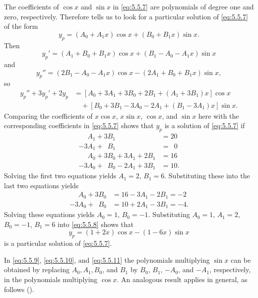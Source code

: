 \begin{solution}
The coefficients of $\cos x$ and $\sin x$ in \eqref{eq:5.5.7} are
polynomials of degree one and zero, respectively. Therefore
 tells us to look for a particular solution of
\eqref{eq:5.5.7} of the form
\begin{equation} \label{eq:5.5.8}
y_p=(A_0+A_1x)\cos x+(B_0+B_1x)\sin x.
\end{equation}
Then
\begin{equation} \label{eq:5.5.9}
y_p'=(A_1+B_0+B_1x)\cos x+(B_1-A_0-A_1x)\sin x
\end{equation}
and
\begin{equation} \label{eq:5.5.10}
 y_p''=(2B_1-A_0-A_1x)\cos x-(2A_1+B_0+B_1x)\sin x,
\end{equation}
so
\begin{equation} \label{eq:5.5.11}
\begin{aligned}
y_p''+3y_p'+2y_p
&=\left[A_0+3 A_1+3 B_0+2 B_1+(A_1+3 B_1)x\right]\cos x\\
&\quad{}+ \left[B_0+3 B_1-3 A_0-2 A_1+(B_1-3 A_1)x\right]\sin x.
\end{aligned}
\end{equation}
Comparing the coefficients of $x\cos x$, $x\sin x$, $\cos x$, and
$\sin x$ here with the corresponding coefficients in \eqref{eq:5.5.7}
shows that $y_p$ is a solution of \eqref{eq:5.5.7} if
\begin{align*}
\phantom{-3}A_1+3B_1&=20\\
-3A_1+\phantom{3}B_1&=\phantom{1}0\\
\phantom{-3}A_0+3B_0+3A_1+2B_1&=16\\
-3A_0+\phantom{3}B_0-2A_1+3B_1&=10.
\end{align*}
Solving the first two equations yields $A_1=2$, $B_1=6$.
Substituting these into the last two equations  yields
\begin{align*}
\phantom{-3}A_0+3B_0&=16-3A_1-2B_1=-2\\
-3A_0+\phantom{3}B_0&=10+2A_1-3B_1=-4.
\end{align*}
Solving these equations yields $A_0=1$, $B_0=-1$.
Substituting $A_0=1$, $A_1=2$, $B_0=-1$, $B_1=6$ into
\eqref{eq:5.5.8} shows that
\[
y_p=(1+2x)\cos x-(1-6x)\sin x
\]
is a particular solution of  \eqref{eq:5.5.7}.
\end{solution}



In \eqref{eq:5.5.9}, \eqref{eq:5.5.10}, and \eqref{eq:5.5.11} the polynomials
multiplying $\sin x$ can be obtained by replacing $A_0,A_1,B_0$,
and $B_1$ by $B_0$, $B_1$, $-A_0$, and $-A_1$, respectively, in the
polynomials multiplying $\cos x$. An analogous result applies in
general, as follows ().



